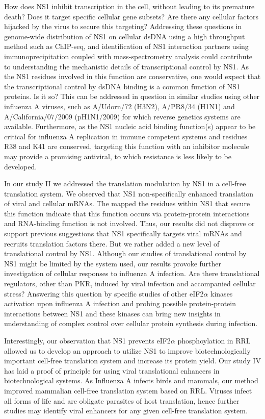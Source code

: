 		How does NS1 inhibit transcription in the cell, without leading to its premature death? Does it target specific cellular gene subsets? Are there any cellular factors hijacked by the virus to secure this targeting? Addressing these questions in genome-wide distribution of NS1 on cellular dsDNA using a high throughput method such as ChIP-seq, and identification of NS1 interaction partners using immunoprecipitation coupled with mass-spectrometry analysis could contribute to understanding the mechanistic details of transcriptional control by NS1. As the NS1 residues involved in this function are conservative, one would expect that the transcriptional control by dsDNA binding is a common function of NS1 proteins. Is it so? This can be addressed in question in similar studies using other influenza A viruses, such as A/Udorn/72 (H3N2), A/PR8/34 (H1N1) and A/California/07/2009 (pH1N1/2009) for which reverse genetics systems are available. Furthermore, as the NS1 nucleic acid binding function(s) appear to be critical for influenza A replication in immune competent systems and residues R38 and K41 are conserved, targeting this function with an inhibitor molecule may provide a promising antiviral, to which resistance is less likely to be developed.
		
		In our study II we addressed the translation modulation by NS1 in a cell-free translation system. We observed that NS1 non-specifically enhanced translation of viral and cellular mRNAs. The mapped the residues within NS1 that secure this function indicate that this function occurs via protein-protein interactions and RNA-binding function is not involved. Thus, our results did not disprove or support previous suggestions that NS1 specifically targets viral mRNAs and recruits translation factors there. But we rather added a new level  of translational control by NS1. Although our studies of translational control by NS1 might be limited by the system used, our results provoke further investigation of cellular responses to influenza A infection. Are there translational regulators, other than PKR, induced by viral infection and accompanied cellular stress? Answering this question by specific studies of other eIF2$\alpha$ kinases activation upon influenza A infection and probing possible protein-protein interactions between NS1 and these kinases can bring new insights in understanding of complex control over cellular protein synthesis during infection.
		
		Interestingly, our observation that NS1 prevents eIF2$\alpha$ phosphoylation in RRL allowed us to develop an approach to utilize NS1 to improve biotechnologically important cell-free translation system and increase its protein yield. Our study IV has laid a proof of principle for using viral translational enhancers in biotechnological systems. As Influenza A infects birds and mammals, our method improved mammalian cell-free translation system based on \gls{RRL}. Viruses infect all forms of life and are obligate parasites of host translation, hence further studies may identify viral enhancers for any given cell-free translation system.
		
